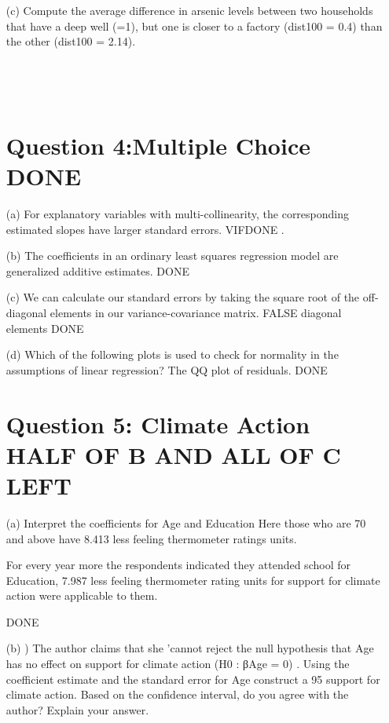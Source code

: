 \documentclass[12pt,letterpaper]{article}
\begin{document}
\begin{enumerate}
\begin{verbatim}
		\end{verbatim}
		\item [(c)] Compute the average difference in arsenic levels between two households that have a
		deep well (=1), but one is closer to a factory (dist100 = 0.4) than the other (dist100 =
		2.14).
		
		\begin{verbatim}
			
			
			
		\end{verbatim}
		\newpage
		\section*{Question 4:Multiple Choice DONE}
		\item [(a)] For explanatory variables with multi-collinearity, the corresponding estimated slopes have
		larger standard errors.
		VIFDONE .
		
		\item [(b)] The coefficients in an ordinary least squares regression model are generalized additive estimates.
		DONE 
		
		\item [(c)] We can calculate our standard errors by taking the square root of the off-diagonal elements
		in our variance-covariance matrix.
		FALSE
		diagonal elements DONE
		
		\item [(d)] Which of the following plots is used to check for normality in the assumptions of linear
		regression?
		The QQ plot of residuals.
		DONE
		
		\vspace{.5cm}
		\newpage
		\section*{Question 5: Climate Action HALF OF B AND ALL OF C LEFT}
		\item [(a)]  Interpret the coefficients for Age and Education
		Here those who are 70 and above have 8.413 less feeling thermometer ratings units. 
		
		For every year more the respondents indicated they attended school for Education, 7.987 less feeling thermometer rating units for support for climate action were applicable to them. 
		
		DONE
		
		\item [(b)] ) The author claims that she ’cannot reject the null hypothesis that Age has no effect on support for climate action 
		(H0 : βAge = 0) .
		Using the coefficient estimate and the
		standard error for Age construct a 95%
		support for climate action. Based on the confidence interval, do you agree with the
		author? Explain your answer.
		

\end{enumerate}
\end{document}
